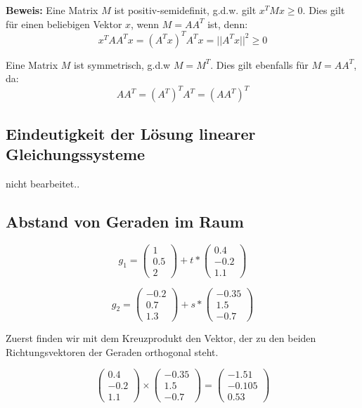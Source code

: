 \documentclass{article}
\begin{document}
\textbf{Beweis: }
Eine Matrix \(M\) ist positiv-semidefinit, g.d.w. gilt \(x^TMx \geq 0\).
Dies gilt für einen beliebigen Vektor \(x\), wenn \(M=AA^T\) ist, denn:
\[x^TAA^Tx = (A^Tx)^TA^Tx = ||A^Tx||^2 \geq 0\]

Eine Matrix \(M\) ist symmetrisch, g.d.w \(M=M^T\).
Dies gilt ebenfalls für \(M=AA^T\), da:
\[AA^T = (A^T)^TA^T = (AA^T)^T\]

\subsection{Eindeutigkeit der Lösung linearer Gleichungssysteme}

nicht bearbeitet..

\subsection{Abstand von Geraden im Raum}

\[
    g_1 = 
    \begin{pmatrix}
        1 \\ 0.5 \\ 2
    \end{pmatrix}
    + t * 
    \begin{pmatrix}
        0.4 \\ -0.2 \\ 1.1
    \end{pmatrix}
\]

\[
    g_2 = 
    \begin{pmatrix}
        -0.2 \\ 0.7 \\ 1.3
    \end{pmatrix}
    + s *
    \begin{pmatrix}
        -0.35 \\ 1.5 \\ -0.7
    \end{pmatrix}
\]

Zuerst finden wir mit dem Kreuzprodukt den Vektor, der zu den beiden Richtungsvektoren der Geraden orthogonal steht.

\[
    \begin{pmatrix}
        0.4 \\ -0.2 \\ 1.1
    \end{pmatrix}
    \times
    \begin{pmatrix}
        -0.35 \\ 1.5 \\ -0.7
    \end{pmatrix}
    =
    \begin{pmatrix}
        -1.51 \\ -0.105 \\ 0.53
    \end{pmatrix}
\]
\end{document}
